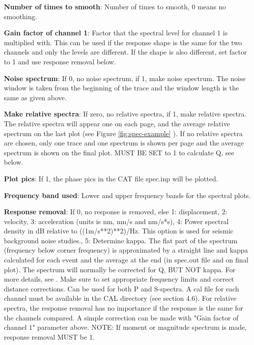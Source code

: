 \textbf{Number of times to smooth}: Number of times to smooth, 0 means no smoothing. 

\textbf{Gain factor of channel 1}: Factor that the spectral level for channel 1 is multiplied with. This can be used if the response shape is the same for the two channels and only the levels are different. If the shape is also different, set factor to 1 and use response removal below. 

\textbf{Noise spectrum}: If 0, no noise spectrum, if 1, make noise spectrum. The noise window is taken from the beginning of the trace and the window length is the same as given above. 

\textbf{Make relative spectra}: If zero, no relative spectra, if 1, make relative spectra. The relative spectra will appear one on each page, and the average relative spectrum on the last plot (see Figure 
\ref{fig:spec-example}
). If no relative spectra are chosen, only one trace and one spectrum is shown per page and the average spectrum is shown on the final plot. MUST BE SET to 1 to calculate Q, see below. 

\textbf{Plot pics}: If 1, the phase pics in the CAT file spec.inp will be plotted. 

\textbf{Frequency band used}: Lower and upper frequency bands for the spectral plots. 

\textbf{Response removal}: If 0, no response is removed, else 1: displacement, 2: velocity, 3: acceleration (units is nm, nm/s and nm/s*s), 4: Power spectral density in dB relative to ((1m/s**2)**2)/Hz. This option is used for seismic background noise studies., 5: Determine kappa. The flat part of the spectrum (frequency below corner frequency) is approximated by a straight line and kappa calculated for each event and the average at the end (in spec.out file and on final plot). The spectrum will normally be corrected for Q, BUT NOT kappa. For more details, see \citep{havskov2010}. Make sure to set appropriate frequency limits and correct distance corrections. Can be used for both P and S-spectra. A cal file for each channel must be available in the CAL directory (see section 4.6). For relative spectra, the response removal has no importance if the response is the same for the channels compared. A simple correction can be made with "Gain factor of channel 1" parameter above. NOTE: If moment or magnitude spectrum is made, response removal MUST be 1. 

